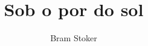 \documentclass[12pt]{extarticle}
\begin{document}
\newcommand{\AutorLivro}{Bram Stoker}
\newcommand{\TituloLivro}{Sob o por do sol}
\newcommand{\Tema}{Ficção, mistério e fantasia}
\newcommand{\Genero}{Romance}
\newcommand{\imagemCapa}{./images/PNLD0011-01.png}
\newcommand{\issnppub}{---}
\newcommand{\issnepub}{---}
\newcommand{\colaborador}{\textbf{Michelle Etienne Florence, Bruno Gradella e Vicente Castro} é uma pessoa incrível e vai fazer um bom serviço.}


\title{\TituloLivro}
\author{\AutorLivro}
\def\authornotes{\colaborador}

\date{}
\maketitle

\baselineskip\par
\end{document}
